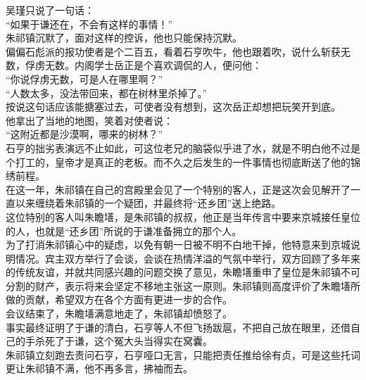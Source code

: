 \begin{multicols}{\theparacolNo}
吴瑾只说了一句话：\\

“如果于谦还在，不会有这样的事情！”\\

朱祁镇沉默了，面对这样的控诉，他也只能保持沉默。\\

偏偏石彪派的报功使者是个二百五，看着石亨吹牛，他也跟着吹，说什么斩获无数，俘虏无数。内阁学士岳正是个喜欢调侃的人，便问他：\\

“你说俘虏无数，可是人在哪里啊？”\\

“人数太多，没法带回来，都在树林里杀掉了。”\\

按说这句话应该能搪塞过去，可使者没有想到，这次岳正却想把玩笑开到底。\\

他拿出了当地的地图，笑着对使者说：\\

“这附近都是沙漠啊，哪来的树林？”\\

石亨的拙劣表演远不止如此，可这位老兄的脑袋似乎进了水，就是不明白他不过是个打工的，皇帝才是真正的老板。而不久之后发生的一件事情也彻底断送了他的锦绣前程。\\

在这一年，朱祁镇在自己的宫殿里会见了一个特别的客人，正是这次会见解开了一直以来缠绕着朱祁镇的一个疑团，并最终将“还乡团”送上绝路。\\

这位特别的客人叫朱瞻墡，是朱祁镇的叔叔，他正是当年传言中要来京城接任皇位的人，也就是“还乡团”所说的于谦准备拥立的那个人。\\

为了打消朱祁镇心中的疑虑，以免有朝一日被不明不白地干掉，他特意来到京城说明情况。宾主双方举行了会谈，会谈在热情洋溢的气氛中举行，双方回顾了多年来的传统友谊，并就共同感兴趣的问题交换了意见，朱瞻墡重申了皇位是朱祁镇不可分割的财产，表示将来会坚定不移地主张这一原则。朱祁镇则高度评价了朱瞻墡所做的贡献，希望双方在各个方面有更进一步的合作。\\

会议结束了，朱瞻墡满意地走了，朱祁镇却愤怒了。\\

事实最终证明了于谦的清白，石亨等人不但飞扬跋扈，不把自己放在眼里，还借自己的手杀死了于谦，这个冤大头当得实在窝囊。\\

朱祁镇立刻跑去责问石亨，石亨哑口无言，只能把责任推给徐有贞，可是这些托词更让朱祁镇不满，他不再多言，拂袖而去。\\


\end{multicols}
